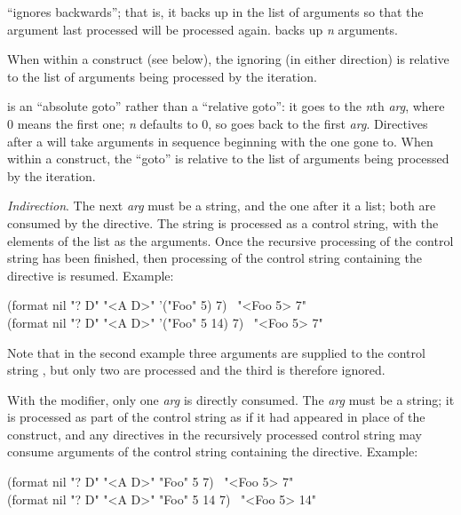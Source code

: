 \begin{flushdesc}
\cd{{\Xtilde}:*} ``ignores backwards''; that is, it backs up in the list of
arguments so that the argument last processed will be processed again.
 backs up \emph{n} arguments.

When within a \cd{{\Xtilde}{\Xlbrace}} construct
(see below), the ignoring (in either direction) is relative to the list
of arguments being processed by the iteration.

 is an ``absolute goto'' rather than a ``relative goto'':
it goes to the \emph{n}th \emph{arg}, where 0 means the first one;
\emph{n} defaults to 0, so \cd{{\Xtilde}{\Xatsign}*} goes back to the first \emph{arg}.
Directives after a 
will take arguments in sequence beginning with the one gone to.
When within a \cd{{\Xtilde}{\Xlbrace}} construct, the ``goto''
is relative to the list of arguments being processed by the iteration.

\item[\cd{{\Xtilde}?}]
\emph{Indirection}.
The next \emph{arg} must be a string, and the one after it a list;
both are consumed by the  directive.
The string is processed as a  control string, with the
elements of the list as the arguments.  Once the recursive processing
of the control string has been finished, then processing of the control
string containing the  directive is resumed.
Example:
\begin{lisp}
(format nil "{\Xtilde}? {\Xtilde}D" "<{\Xtilde}A {\Xtilde}D>" '("Foo" 5) 7) \EV\ "<Foo 5> 7" \\
(format nil "{\Xtilde}? {\Xtilde}D" "<{\Xtilde}A {\Xtilde}D>" '("Foo" 5 14) 7) \EV\ "<Foo 5> 7"
\end{lisp}
Note that in the second example three arguments are supplied
to the control string , but only two are processed
and the third is therefore ignored.

With the \cd{{\Xatsign}} modifier, only one \emph{arg} is directly consumed.
The \emph{arg} must be a string; it is processed as part of the control
string as if it had appeared in place of the  construct,
and any directives in the recursively processed control string may
consume arguments of the control string containing the 
directive.
Example:
\begin{lisp}
(format nil "{\Xtilde}{\Xatsign}? {\Xtilde}D" "<{\Xtilde}A {\Xtilde}D>" "Foo" 5 7) \EV\ "<Foo 5> 7" \\
(format nil "{\Xtilde}{\Xatsign}? {\Xtilde}D" "<{\Xtilde}A {\Xtilde}D>" "Foo" 5 14 7) \EV\ "<Foo 5> 14"
\end{lisp}


\end{flushdesc}
